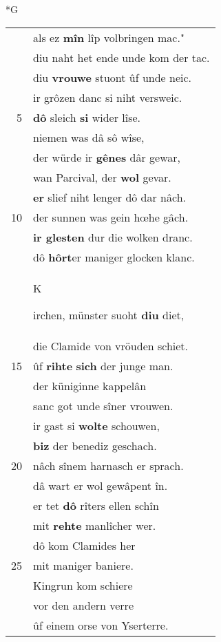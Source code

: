\documentclass[8pt,a4paper,notitlepage]{article}
\begin{document}
\newpage
\begin{table}[ht]
\begin{minipage}[t]{0.5\linewidth}
\small
\begin{center}*G
\end{center}
\begin{tabular}{rl}
 & als ez \textbf{mîn} lîp volbringen mac."\\ 
 & diu naht het ende unde kom der tac.\\ 
 & diu \textbf{vrouwe} stuont ûf unde neic.\\ 
 & ir grôzen danc si niht versweic.\\ 
5 & \textbf{dô} sleich \textbf{si} wider lîse.\\ 
 & niemen was dâ sô wîse,\\ 
 & der würde ir \textbf{gênes} dâr gewar,\\ 
 & wan Parcival, der \textbf{wol} gevar.\\ 
 & \textbf{er} slief niht lenger dô dar nâch.\\ 
10 & der sunnen was gein hœhe gâch.\\ 
 & \textbf{ir glesten} dur die wolken dranc.\\ 
 & dô \textbf{hôrt}er maniger glocken klanc.\\ 
 & \begin{large}K\end{large}irchen, münster suoht \textbf{diu} diet,\\ 
 & die Clamide von vröuden schiet.\\ 
15 & ûf \textbf{rihte} \textbf{sich} der junge man.\\ 
 & der küniginne kappelân\\ 
 & sanc got unde sîner vrouwen.\\ 
 & ir gast si \textbf{wolte} schouwen,\\ 
 & \textbf{biz} der benediz geschach.\\ 
20 & nâch sînem harnasch er sprach.\\ 
 & dâ wart er wol gewâpent în.\\ 
 & er tet \textbf{dô} rîters ellen schîn\\ 
 & mit \textbf{rehte} manlîcher wer.\\ 
 & dô kom Clamides her\\ 
25 & mit maniger baniere.\\ 
 & Kingrun kom schiere\\ 
 & vor den andern verre\\ 
 & ûf einem orse von Yserterre.\\ 

\end{tabular}
\end{minipage}
\end{table}
\end{document}
